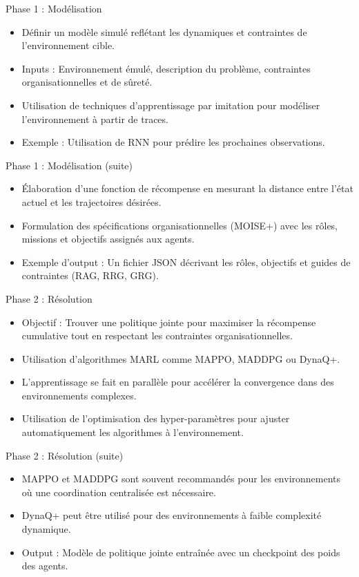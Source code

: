 \documentclass{beamer}
\begin{document}
\begin{frame}{Phase 1 : Modélisation}
    \begin{itemize}
        \item Définir un modèle simulé reflétant les dynamiques et contraintes de l'environnement cible.
        \item Inputs : Environnement émulé, description du problème, contraintes organisationnelles et de sûreté.
        \item Utilisation de techniques d'apprentissage par imitation pour modéliser l'environnement à partir de traces.
        \item Exemple : Utilisation de RNN pour prédire les prochaines observations.
    \end{itemize}
\end{frame}

\begin{frame}{Phase 1 : Modélisation (suite)}
    \begin{itemize}
        \item Élaboration d'une fonction de récompense en mesurant la distance entre l'état actuel et les trajectoires désirées.
        \item Formulation des spécifications organisationnelles (MOISE+) avec les rôles, missions et objectifs assignés aux agents.
        \item Exemple d'output : Un fichier JSON décrivant les rôles, objectifs et guides de contraintes (RAG, RRG, GRG).
    \end{itemize}
\end{frame}

\begin{frame}{Phase 2 : Résolution}
    \begin{itemize}
        \item Objectif : Trouver une politique jointe pour maximiser la récompense cumulative tout en respectant les contraintes organisationnelles.
        \item Utilisation d'algorithmes MARL comme MAPPO, MADDPG ou DynaQ+.
        \item L'apprentissage se fait en parallèle pour accélérer la convergence dans des environnements complexes.
        \item Utilisation de l'optimisation des hyper-paramètres pour ajuster automatiquement les algorithmes à l'environnement.
    \end{itemize}
\end{frame}

\begin{frame}{Phase 2 : Résolution (suite)}
    \begin{itemize}
        \item MAPPO et MADDPG sont souvent recommandés pour les environnements où une coordination centralisée est nécessaire.
        \item DynaQ+ peut être utilisé pour des environnements à faible complexité dynamique.
        \item Output : Modèle de politique jointe entraînée avec un checkpoint des poids des agents.
    \end{itemize}
\end{frame}
\end{document}
